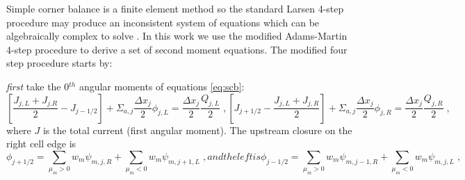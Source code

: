 Simple corner balance is a finite element method so the standard Larsen 4-step procedure may produce an inconsistent system of equations which can be algebraically complex to solve \cite{adams_fast_2002}.
In this work we use the modified Adams-Martin 4-step procedure \cite{adams_1992_dsadfe} to derive a set of second moment equations.
The modified four step procedure starts by:

\textit{first} take the 0$^{th}$ angular moments of equations \eqref{eq:scb}:
\begin{subequations}
\label{eq:zeroth}
\begin{equation}
\label{eq:zeroth_left}
    \left[ \frac{J_{j,L} + J_{j.R}}{2} - J_{j-1/2} \right] + \Sigma_{a,j} \frac{\Delta x_j}{2} \phi_{j,L} = \frac{\Delta x_j}{2} \frac{Q_{j,L}}{2} \; ,
\end{equation}
\begin{equation}
     \left[ J_{j+1/2} - \frac{J_{j,L} + J_{j,R}}{2} \right] + \Sigma_{a,j} \frac{\Delta x_j}{2} \phi_{j,R} = \frac{\Delta x_j}{2} \frac{Q_{j,R}}{2} \; ,
\end{equation}
\end{subequations}
where $J$ is the total current (first angular moment). The upstream closure on the right cell edge is
\begin{subequations}
\label{edgescalar}
\begin{equation}
   \phi_{j+1/2} = \sum\limits_{\mu_{m}>0} w_m   \psi_{m,j,R}+\sum\limits_{\mu_{m}<0} w_m \psi_{m,j+1,L} \;,
\end{equation}
and the left is
\begin{equation}
   \phi_{j-1/2} = \sum\limits_{\mu_{m}>0} w_m   \psi_{m,j-1,R}+\sum\limits_{\mu_{m}<0} w_m \psi_{m,j,L} \;,
\end{equation}
\end{subequations}

